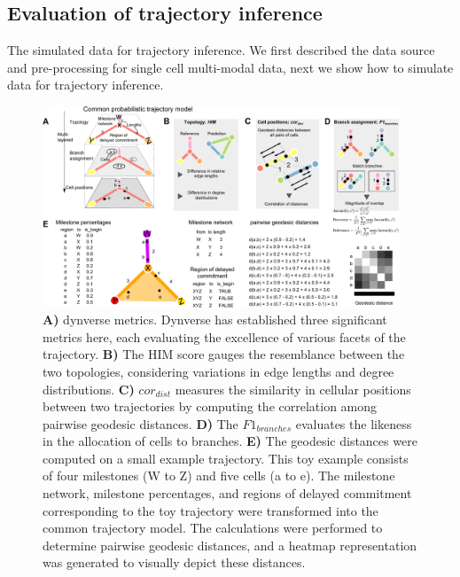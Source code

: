 \subsection{Evaluation of trajectory inference}
\label{chapter:PHLOWER_bench:metrics}
The simulated data for trajectory inference. We first described the data source and pre-processing for single cell multi-modal data, next we show how to simulate data for trajectory inference.
\begin{figure}[!h]
	\centering
	\includegraphics[width=0.95\textwidth]{dynverse_metrics/fig}
	\vspace{0.1cm}
	\caption[Dynverse metrics]{ \textbf{A)} dynverse metrics. Dynverse has established three significant metrics here, each evaluating the excellence of various facets of the trajectory. \textbf{B)} The HIM score gauges the resemblance between the two topologies, considering variations in edge lengths and degree distributions. \textbf{C)} $cor_{dist}$ measures the similarity in cellular positions between two trajectories by computing the correlation among pairwise geodesic distances. \textbf{D)} The $F1_{branches}$ evaluates the likeness in the allocation of cells to branches. \textbf{E)} The geodesic distances were computed on a small example trajectory. This toy example consists of four milestones (W to Z) and five cells (a to e). The milestone network, milestone percentages, and regions of delayed commitment corresponding to the toy trajectory were transformed into the common trajectory model. The calculations were performed to determine pairwise geodesic distances, and a heatmap representation was generated to visually depict these distances.}
	\label{fig:dynverse_metrics}
\end{figure}

